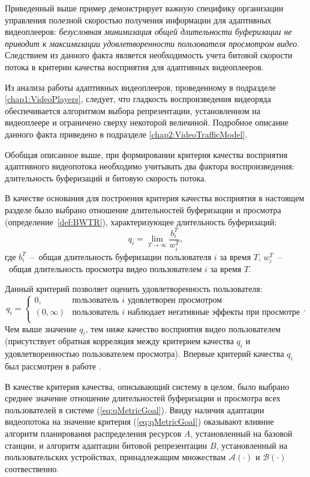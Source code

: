 Приведенный выше пример демонстрирует важную специфику организации управления полезной скоростью получения информации для адаптивных видеоплееров: \textit{безусловная минимизация общей длительности буферизации не приводит к максимизации удовлетворенности пользователя просмотром видео}. Следствием из данного факта является необходимость учета битовой скорости потока в критерии качества восприятия для адаптивных видеоплееров.

Из анализа работы адаптивных видеоплееров, проведенному в подразделе \ref{chap1:VideoPlayers}, следует, что гладкость воспроизведения видеоряда обеспечивается алгоритмом выбора репрезентации, установленном на видеоплеере и ограничено сверху некоторой величиной. Подробное описание данного факта приведено в подразделе \ref{chap2:VideoTrafficModel}.

Обобщая описанное выше, при формировании критерия качества восприятия адаптивного видеопотока необходимо учитывать два фактора воспроизведения: длительность буферизаций и битовую скорость потока.

В качестве основания для построения критерия качества восприятия в настоящем разделе было выбрано отношение длительностей буферизации и просмотра (определение~\ref{def:BWTR}), характеризующее длительность буферизаций: $$q_i = \lim\limits_{T\rightarrow\infty} \frac{b_i^T}{w_i^T},$$
где $b_i^T$~--~общая длительность буферизации пользователя $i$ за время $T$, $w_i^T$~--~общая длительность просмотра видео пользователем $i$ за время $T$.

Данный критерий позволяет оценить удовлетворенность пользователя:
$$q_i=
\begin{cases}
0, & \text{пользователь $i$ удовлетворен просмотром}\\
(0, \infty) & \text{пользователь $i$ наблюдает негативные эффекты при просмотре}\\
\end{cases}.
$$
Чем выше значение $q_i$, тем ниже качество восприятия видео пользователем (присутствует обратная корреляция между критерием качества $q_i$ и удовлетворенностью пользователем просмотра). Впервые критерий качества $q_i$ был рассмотрен в работе \cite{Bakin_Globecom}.

В качестве критерия качества, описывающий систему в целом, было выбрано среднее значение отношение длительностей буферизации и просмотра всех пользователей в системе (\ref{eq:qMetricGoal}). Ввиду наличия адаптации видеопотока на значение критерия (\ref{eq:qMetricGoal}) оказывают влияние алгоритм планирования распределения ресурсов $A$, установленный на базовой станции, и алгоритм адаптации битовой репрезентации $B$, установленный на пользовательских устройствах, принадлежащим множествам $\mathcal{A}(\cdot)$ и $\mathcal{B}(\cdot)$ соотвественно.

